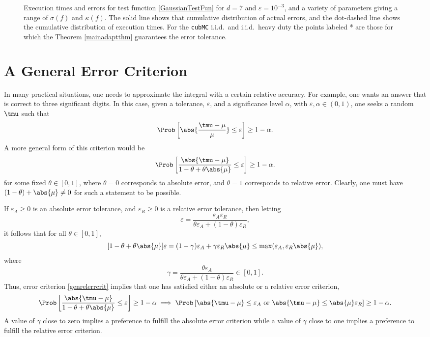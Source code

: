 \documentclass[graybox]{svmult}
\begin{document}
\begin{figure}
\caption{Execution times and errors for test function \eqref{GaussianTestFun} for $d=7$ and $\varepsilon=10^{-3}$, and a variety of parameters giving a range of $\sigma(f)$ and $\kappa(f)$. The solid line shows that cumulative distribution of actual errors, and the dot-dashed line shows the cumulative distribution of execution times.  For the {\tt cubMC} i.i.d.\ and i.i.d.\ heavy duty the points labeled * are those for which the Theorem \ref{mainadaptthm} guarantees the error tolerance.\label{GausstianTestFunHDFig}}
\end{figure}


\section{A General Error Criterion} \label{relerrsec}

In many practical situations, one needs to approximate the integral with a certain relative accuracy.  For example, one wants an answer that is correct to three significant digits.  In this case, given a tolerance, $\varepsilon$, and a significance level $\alpha$, with $\varepsilon, \alpha \in (0, 1)$, one seeks a random $\tmu$ such that 
\begin{equation*} \label{relerrcrit}
\Prob\left[\abs{\frac{\tmu-\mu}{\mu}} \le \varepsilon \right] \geq 1-\alpha.
\end{equation*}
A more general form of this criterion would be
\begin{equation} \label{genrelerrcrit}
\Prob\left[\frac{\abs{\tmu-\mu}} {1-\theta + \theta\abs{\mu}} \le \varepsilon \right] \geq 1-\alpha.
\end{equation}
for some fixed $\theta \in [0,1]$, where $\theta=0$ corresponds to absolute error, and $\theta = 1$ corresponds to relative error.  Clearly, one must have $(1-\theta) + \abs{\mu}\ne0$ for such a statement to be possible.  

If $\varepsilon_{A} \ge 0$ is an absolute error tolerance, and $\varepsilon_{R} \ge 0$ is a relative error tolerance, then letting 
\[
\varepsilon = \frac{\varepsilon_{A}\varepsilon_{R}}{\theta \varepsilon_{A} + (1-\theta) \varepsilon_{R}},
\]
it follows that for all $\theta \in [0,1]$,
\[
[1-\theta + \theta \abs{\mu}]\varepsilon = (1-\gamma)\varepsilon_{A} + \gamma \varepsilon_{R} \abs{\mu} \le \max(\varepsilon_{A},\varepsilon_{R} \abs{\mu}),
\]
where
\[
\gamma = \frac{\theta \varepsilon_{A}}{\theta \varepsilon_{A} + (1-\theta) \varepsilon_{R}} \in [0,1].
\]
Thus, error criterion  \eqref{genrelerrcrit} implies that one has satisfied either an absolute or a relative error criterion, 
\[
\Prob\left[\frac{\abs{\tmu-\mu}} {1-\theta + \theta\abs{\mu}} \le \varepsilon \right] \geq 1-\alpha \implies \Prob\left[\abs{\tmu-\mu} \le \varepsilon_A \text{ or } \abs{\tmu-\mu} \le \abs{\mu}\varepsilon_R \right] \geq 1-\alpha.
\]
A value of $\gamma$ close to zero implies a preference to fulfill the absolute error criterion while a value of $\gamma$ close to one implies a preference to fulfill the relative error criterion.
\end{document}
